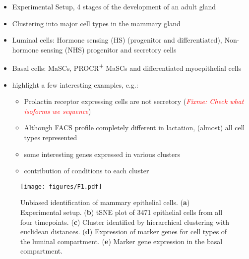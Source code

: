 \documentclass[oneside]{amsart}
\newcommand{\fixme}[1]{\textit{\textcolor{red}{Fixme: #1}}}
\begin{document}
\begin{itemize}
    \item Experimental Setup, 4 stages of the development of an adult gland
    \item Clustering into major cell types in the mammary gland
    \item Luminal cells: Hormone sensing (HS) (progenitor and differentiated), Non-hormone sensing (NHS) progenitor and secretory cells
    \item Basal cells: MaSCs, PROCR\textsuperscript{+} MaSCs and differentiated myoepithelial cells
    \item highlight a few interesting examples, e.g.:
	\begin{itemize}
	    \item Prolactin receptor expressing cells are not secretory (\fixme{Check what isoforms we sequence})
	    \item Although FACS profile completely different in lactation, (almost) all cell types represented
	    \item some interesting genes expressed in various clusters
	    \item contribution of conditions to each cluster
	\end{itemize}
\end{itemize}

\begin{figure}[h]
    \texttt{[image: figures/F1.pdf]}
    \caption{Unbiased identification of mammary epithelial cells.
	(\textbf{a}) Experimental setup.
	(\textbf{b}) tSNE plot of 3471 epithelial cells from all four timepoints.
	(\textbf{c}) Cluster identified by hierarchical clustering with euclidean distances.
	(\textbf{d}) Expression of marker genes for cell types of the luminal compartment.
	(\textbf{e}) Marker gene expression in the basal compartment.
}
\label{fig:f1}
\end{figure}

\newpage
\end{document}
